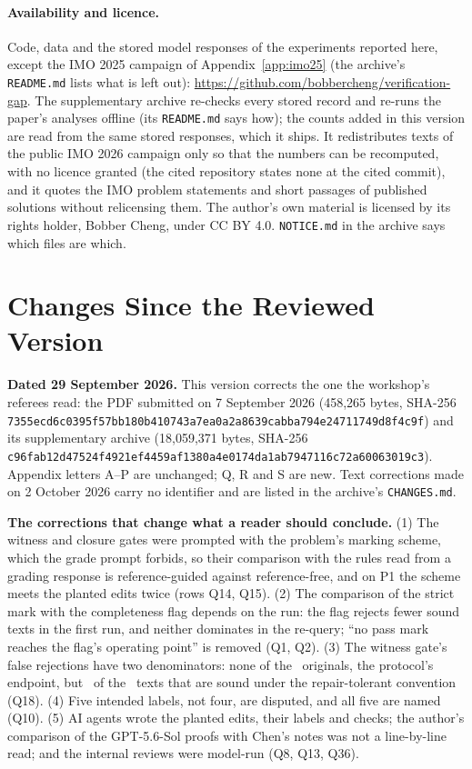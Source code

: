 \paragraph{Availability and licence.} Code, data and the stored model responses of the experiments reported here, except the IMO 2025 campaign of Appendix~\ref{app:imo25} (the archive's \texttt{README.md} lists what is left out): \url{https://github.com/bobbercheng/verification-gap}. The supplementary archive re-checks every stored record and re-runs the paper's analyses offline (its \texttt{README.md} says how); the counts added in this version are read from the same stored responses, which it ships. It redistributes texts of the public IMO 2026 campaign \citep{deedy2026imo} only so that the numbers can be recomputed, with no licence granted (the cited repository states none at the cited commit), and it quotes the IMO problem statements and short passages of published solutions without relicensing them. The author's own material is licensed by its rights holder, Bobber Cheng, under CC BY 4.0. \texttt{NOTICE.md} in the archive says which files are which.

\section{Changes Since the Reviewed Version}
\label{app:changes}
\textbf{Dated 29 September 2026.} This version corrects the one the workshop's referees read: the PDF submitted on 7 September 2026 (458,265 bytes, SHA-256 \texttt{7355ecd6c0395f57\allowbreak bb180b410743a7ea\allowbreak 0a2a8639cabba794\allowbreak e24711749d8f4c9f}) and its supplementary archive (18,059,371 bytes, SHA-256 \texttt{c96fab12d47524f4\allowbreak 921ef4459af1380a\allowbreak 4e0174da1ab79471\allowbreak 16c72a60063019c3}). Appendix letters A--P are unchanged; Q, R and S are new. Text corrections made on 2 October 2026 carry no identifier and are listed in the archive's \texttt{CHANGES.md}.

\textbf{The corrections that change what a reader should conclude.} (1) The witness and closure gates were prompted with the problem's marking scheme, which the grade prompt forbids, so their comparison with the rules read from a grading response is reference-guided against reference-free, and on P1 the scheme meets the planted edits twice (rows Q14, Q15). (2) The comparison of the strict mark with the completeness flag depends on the run: the flag rejects fewer sound texts in the first run, and neither dominates in the re-query; ``no pass mark reaches the flag's operating point'' is removed (Q1, Q2). (3) The witness gate's false rejections have two denominators: none of the \CRNPerClass\ originals, the protocol's endpoint, but \CRWitnessSoundRejP\ of the \CRNSound\ texts that are sound under the repair-tolerant convention (Q18). (4) Five intended labels, not four, are disputed, and all five are named (Q10). (5) AI agents wrote the planted edits, their labels and checks; the author's comparison of the GPT-5.6-Sol proofs with Chen's notes was not a line-by-line read; and the internal reviews were model-run (Q8, Q13, Q36).

